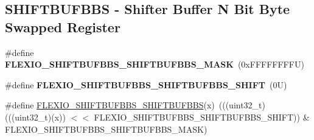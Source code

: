\subsection*{S\+H\+I\+F\+T\+B\+U\+F\+B\+BS -\/ Shifter Buffer N Bit Byte Swapped Register}
\begin{DoxyCompactItemize}
\item 
\mbox{\label{group___f_l_e_x_i_o___register___masks_ga5d6de749d23e178f2a3380ffa4512f92}} 
\#define {\bfseries F\+L\+E\+X\+I\+O\+\_\+\+S\+H\+I\+F\+T\+B\+U\+F\+B\+B\+S\+\_\+\+S\+H\+I\+F\+T\+B\+U\+F\+B\+B\+S\+\_\+\+M\+A\+SK}~(0x\+F\+F\+F\+F\+F\+F\+F\+F\+U)
\item 
\mbox{\label{group___f_l_e_x_i_o___register___masks_ga8d989078a2f9f05c9e61a97734c5b68a}} 
\#define {\bfseries F\+L\+E\+X\+I\+O\+\_\+\+S\+H\+I\+F\+T\+B\+U\+F\+B\+B\+S\+\_\+\+S\+H\+I\+F\+T\+B\+U\+F\+B\+B\+S\+\_\+\+S\+H\+I\+FT}~(0\+U)
\item 
\#define \mbox{\hyperlink{group___f_l_e_x_i_o___register___masks_gafaf4495d148d02415d5f34dd20231f4f}{F\+L\+E\+X\+I\+O\+\_\+\+S\+H\+I\+F\+T\+B\+U\+F\+B\+B\+S\+\_\+\+S\+H\+I\+F\+T\+B\+U\+F\+B\+BS}}(x)~(((uint32\+\_\+t)(((uint32\+\_\+t)(x)) $<$$<$ F\+L\+E\+X\+I\+O\+\_\+\+S\+H\+I\+F\+T\+B\+U\+F\+B\+B\+S\+\_\+\+S\+H\+I\+F\+T\+B\+U\+F\+B\+B\+S\+\_\+\+S\+H\+I\+FT)) \& F\+L\+E\+X\+I\+O\+\_\+\+S\+H\+I\+F\+T\+B\+U\+F\+B\+B\+S\+\_\+\+S\+H\+I\+F\+T\+B\+U\+F\+B\+B\+S\+\_\+\+M\+A\+SK)
\end{DoxyCompactItemize}

